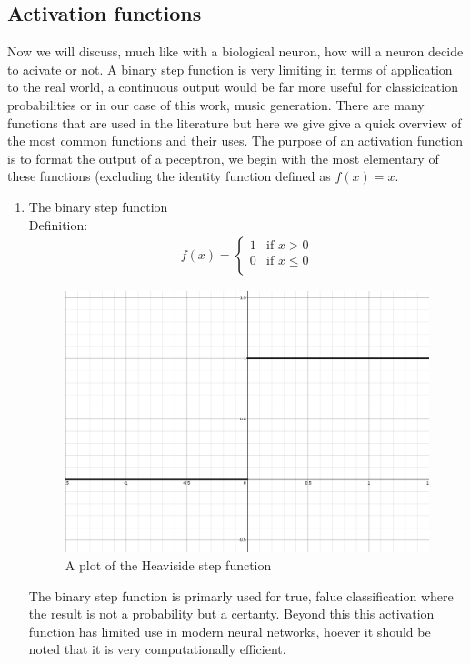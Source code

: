 \documentclass{article}
\begin{document}
\subsection{Activation functions}
Now we will discuss, much like with a biological neuron, how will a neuron decide to acivate or not. A binary step function is very limiting in terms of application to the real world, a continuous output would be far more useful for classicication probabilities or in our case of this work, music generation. There are many functions that are used in the literature but here we give give a quick overview of the most common functions and their uses. The purpose of an activation function is to format the output of a peceptron, we begin with the most elementary of these functions (excluding the identity function defined as $f(x) = x$. 
\begin{enumerate}
\item The binary step function \\
Definition:
\begin{align*}
f(x) = 
\begin{cases}
 1 & \text{if } x > 0 \\
 0 & \text{if } x \leq 0 \\
\end{cases}
\end{align*}
\begin{figure}[H]
\centering
\caption{A plot of the Heaviside step function}
\includegraphics[scale=0.2]{heaviside.png}
\end{figure}
The binary step function is primarly used for true, falue classification where the result is not a probability but a certanty. Beyond this this activation function has limited use in modern neural networks, hoever it should be noted that it is very computationally efficient. 

\end{enumerate}
\end{document}

